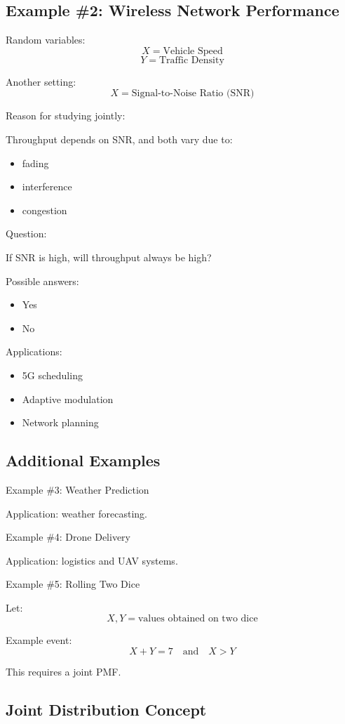 \documentclass[12pt]{article}
\begin{document}
\subsection{Example \#2: Wireless Network Performance}

Random variables:
\[
X = \text{Vehicle Speed}
\]
\[
Y = \text{Traffic Density}
\]

Another setting:
\[
X = \text{Signal-to-Noise Ratio (SNR)}
\]

Reason for studying jointly:

Throughput depends on SNR, and both vary due to:
\begin{itemize}
\item fading
\item interference
\item congestion
\end{itemize}

Question:

If SNR is high, will throughput always be high?

Possible answers:
\begin{itemize}
\item Yes
\item No
\end{itemize}

Applications:
\begin{itemize}
\item 5G scheduling
\item Adaptive modulation
\item Network planning
\end{itemize}

\subsection{Additional Examples}

Example \#3: Weather Prediction

Application: weather forecasting.

Example \#4: Drone Delivery

Application: logistics and UAV systems.

Example \#5: Rolling Two Dice

Let:
\[
X, Y = \text{values obtained on two dice}
\]

Example event:
\[
X + Y = 7 \quad \text{and} \quad X > Y
\]

This requires a joint PMF.

\subsection{Joint Distribution Concept}
\end{document}
